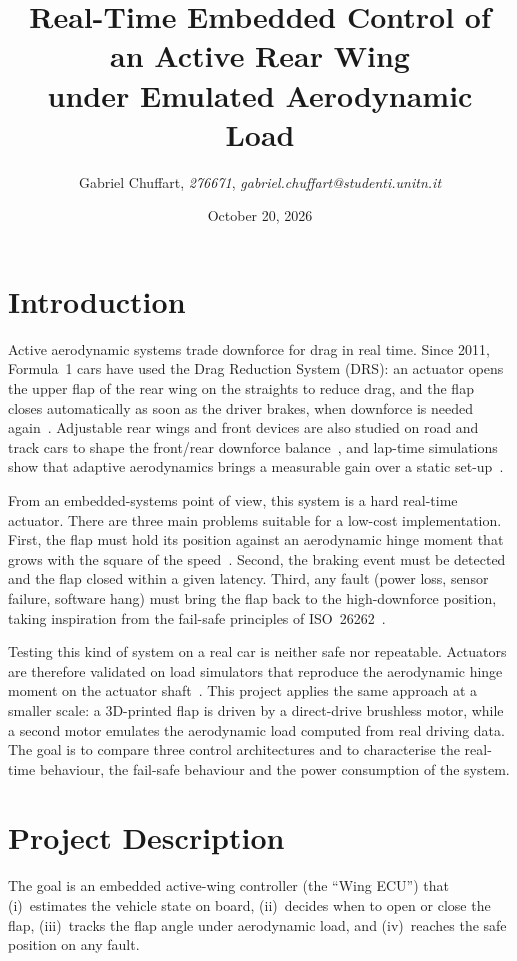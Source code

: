 \documentclass[11pt,a4paper]{article}
\title{Real-Time Embedded Control of an Active Rear Wing\\under Emulated Aerodynamic Load}
\author{Gabriel Chuffart, \textit{276671}, \textit{gabriel.chuffart@studenti.unitn.it}}
\date{October 20, 2026}
\begin{document}
\maketitle

\section{Introduction}
Active aerodynamic systems trade downforce for drag in real time. Since 2011, Formula~1 cars have used the Drag Reduction System (DRS): an actuator opens the upper flap of the rear wing on the straights to reduce drag, and the flap closes automatically as soon as the driver brakes, when downforce is needed again~\cite{therace_drs}. Adjustable rear wings and front devices are also studied on road and track cars to shape the front/rear downforce balance~\cite{decupis2021}, and lap-time simulations show that adaptive aerodynamics brings a measurable gain over a static set-up~\cite{rijns2025}.

From an embedded-systems point of view, this system is a hard real-time actuator. There are three main problems suitable for a low-cost implementation. First, the flap must hold its position against an aerodynamic hinge moment that grows with the square of the speed~\cite{katz1995}. Second, the braking event must be detected and the flap closed within a given latency. Third, any fault (power loss, sensor failure, software hang) must bring the flap back to the high-downforce position, taking inspiration from the fail-safe principles of ISO~26262~\cite{iso26262}.

Testing this kind of system on a real car is neither safe nor repeatable. Actuators are therefore validated on load simulators that reproduce the aerodynamic hinge moment on the actuator shaft~\cite{dellamico2024}. This project applies the same approach at a smaller scale: a 3D-printed flap is driven by a direct-drive brushless motor, while a second motor emulates the aerodynamic load computed from real driving data. The goal is to compare three control architectures and to characterise the real-time behaviour, the fail-safe behaviour and the power consumption of the system.

\section{Project Description}
The goal is an embedded active-wing controller (the ``Wing ECU'') that (i)~estimates the vehicle state on board, (ii)~decides when to open or close the flap, (iii)~tracks the flap angle under aerodynamic load, and (iv)~reaches the safe position on any fault.
\end{document}
